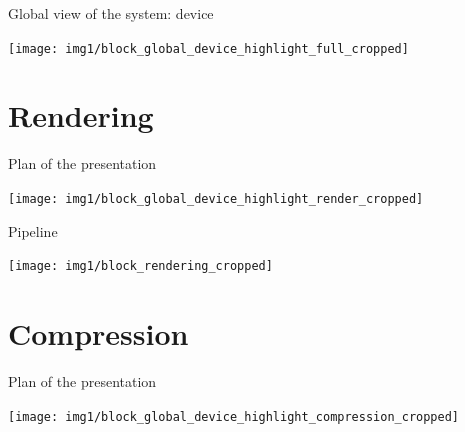 \documentclass[10pt, notes]{beamer}
\begin{document}

\begin{frame}{Global view of the system: device}
    \begin{center}
        \texttt{[image: img1/block\_global\_device\_highlight\_full\_cropped]}
    \end{center}
\end{frame}

\section{Rendering}
\begin{frame}{Plan of the presentation}
    \begin{center}
        \texttt{[image: img1/block\_global\_device\_highlight\_render\_cropped]}
    \end{center}
\end{frame}

\begin{frame}{Pipeline}
    \begin{center}
        \texttt{[image: img1/block\_rendering\_cropped]}
    \end{center}
\end{frame}

\section{Compression}
\begin{frame}{Plan of the presentation}
    \begin{center}
        \texttt{[image: img1/block\_global\_device\_highlight\_compression\_cropped]}
    \end{center}
\end{frame}
\end{document}
